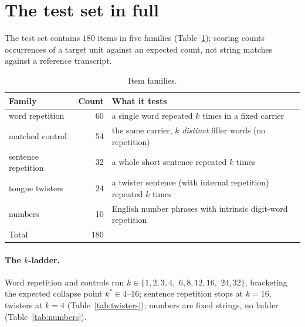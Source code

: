 \section{The test set in full}
\label{sec:testset}

The test set contains $180$ items in five families
(Table~\ref{tab:families}); scoring counts occurrences of a target unit
against an expected count, not string matches against a reference
transcript.

\begin{table}[tp]
\centering
\caption{Item families.}
\label{tab:families}
\begin{tabular}{lrl}
\toprule
Family & Count & What it tests \\
\midrule
word repetition & 60 & a single word repeated $k$ times in a fixed carrier \\
matched control & 54 & the same carrier, $k$ \emph{distinct} filler words (no repetition) \\
sentence repetition & 32 & a whole short sentence repeated $k$ times \\
tongue twisters & 24 & a twister sentence (with internal repetition) repeated $k$ times \\
numbers & 10 & English number phrases with intrinsic digit-word repetition \\
\midrule
Total & 180 & \\
\bottomrule
\end{tabular}
\end{table}

\paragraph{The $k$-ladder.} Word repetition and controls run
$k \in \{1,2,3,4,$ $6,8,12,16,$ $24,32\}$, bracketing the expected collapse
point $k^\ast \in 4$--$16$; sentence repetition stops at $k=16$, twisters
at $k=4$ (Table~\ref{tab:twisters}); numbers are fixed strings, no
ladder (Table~\ref{tab:numbers}).

